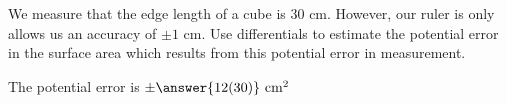 \documentclass{ximera}
\author{Steven Gubkin}
\begin{document}
\begin{exercise}



We measure that the edge length of a cube is $30 \textrm{ cm}$.  However, our ruler is only allows us an accuracy of $\pm 1 \textrm{ cm}$.  Use differentials to estimate the potential error in the surface area which results from this potential error in measurement.

\begin{prompt}
	The potential error is $\pm \answer{12(30)} \textrm{ cm}^2$ 
\end{prompt}

\end{exercise}
\end{document}
